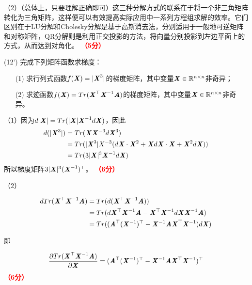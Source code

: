 \documentclass[12pt,a4paper,openany,twoside]{ctexbook}
\begin{document}
\begin{Solution}
	（2）（总体上，只要理解正确即可）这三种分解方式的联系在于将一个非三角矩阵转化为三角矩阵，这样便可以有效提高实际应用中一系列方程组求解的效率。它们区别在于LU分解和Cholesky分解是基于高斯消去法，分别适用于一般地可逆矩阵和对称矩阵，QR分解则是利用正交投影的方法，将向量分别投影到左边平面上的方式，从而达到对角化。 \hfill \textcolor{red}{\textbf{（5分）}}
\end{Solution}


\begin{exercise}(12')
	完成下列矩阵函数求梯度：
	\begin{itemize}
		\item [(1)] 求行列式函数$f(\MX)=|\MX^3|$的梯度矩阵，其中变量$\MX \in \NR^{n\times n} $非奇异；
		\item [(2)] 求迹函数$f(\MX) = Tr(\MX^\top\MX^{-1}\MA)$的梯度矩阵，其中变量$\MX \in \NR^{n\times n} $非奇异。
	\end{itemize}
\end{exercise}
\begin{Solution}
	（1）因为$d|\MX| =Tr(|\MX|\MX^{-1}d\MX)$，因此
	$$
	\begin{aligned}
		d(|\MX^{3}|)&= Tr( \MX \MX^{-3} d\MX^{3})\\
		&=Tr(|\MX^3| X^{-3} (d\MX \cdot \MX^2+\MX d\MX \cdot \MX + \MX^2d\MX))\\
		&=Tr(3|\MX|^3 \MX^{-1} d\MX)
	\end{aligned}
	$$
	所以梯度矩阵$3|\MX|^3 (\MX^{-1})^\top$。
	\hfill \textcolor{red}{\textbf{（6分）}}
	
	（2）
	
	$$
	\begin{aligned}
		dTr(\MX^\top \MX^{-1} \MA) &= Tr(d(\MX^\top \MX^{-1} \MA))\\
		&= Tr( d\MX^\top \MX^{-1}\MA -\MX^\top \MX^{-1} d\MX \MX^{-1} \MA)\\
		&= Tr((\MA^\top (\MX^{-1})^\top -\MX^{-1}\MA\MX^\top \MX^{-1}) d\MX)
	\end{aligned}
	$$
	
	即
	
	$$
	\begin{aligned}
		\frac{\partial Tr(\MX^\top \MX^{-1} \MA)}{\partial \MX} = (\MA^\top (\MX^{-1})^\top -\MX^{-1}\MA\MX^\top \MX^{-1})^\top
	\end{aligned}
	$$\hfill \textcolor{red}{\textbf{（6分）}}
	
\end{Solution}
\end{document}

